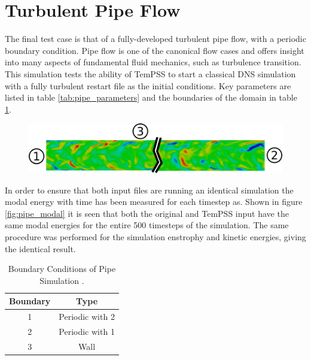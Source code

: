 \documentclass[11pt, a4paper]{report}
\begin{document}
\newpage
\section{Turbulent Pipe Flow}
The final test case is that of a fully-developed turbulent pipe flow, with a periodic boundary condition. Pipe flow is one of the canonical flow cases and offers insight into many aspects of fundamental fluid mechanics, such as turbulence transition. This simulation tests the ability of TemPSS to start a classical DNS simulation with a fully turbulent restart file as the initial conditions. Key parameters are listed in table \ref{tab:pipe_parameters} and the boundaries of the domain in table \ref{tab:pipe_boundaries}.

\begin{figure}[htb!]
 \centering
 \includegraphics[width=.95\linewidth,  clip=true, trim = 0cm 0cm 0cm 0cm]{pipe_domain_real}
 \label{fig:pipe_domain}
\end{figure}

In order to ensure that both input files are running an identical simulation the modal energy with time has been measured for each timestep as. Shown in figure \ref{fig:pipe_modal} it is seen that both the original and TemPSS input have the same modal energies for the entire 500 timesteps of the simulation. The same procedure was performed for the simulation enstrophy and kinetic energies, giving the identical result.

\begin{table}[htb!]
	\centering
    \begin{tabular}{ c || c }
    \hline
    Boundary & Type \\
    \hline
    1 & Periodic with 2 \\
    2 & Periodic with 1\\
    3 & Wall \\
    \hline
    \end{tabular}
    \caption{Boundary Conditions of Pipe Simulation	.}
    \label{tab:pipe_boundaries}
\end{table}
\end{document}
